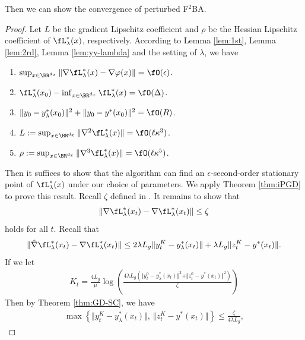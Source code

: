 Then we can show the convergence of perturbed F${}^2$BA.
\thmPFBA*
\begin{proof}
Let $L$ be the gradient Lipschitz coefficient and $\rho$ be the Hessian Lipschitz coefficient of $\fL_{\lambda}^*(x)$, respectively.
According to Lemma \ref{lem:1st}, Lemma \ref{lem:2rd}, Lemma \ref{lem:yy-lambda}  and the setting of $\lambda$, we have
\begin{enumerate}[label=\alph*.]
    \item $\sup_{x \in \BR^{d_x}} \Vert \nabla \fL_{\lambda}^*(x) - \nabla \varphi(x) \Vert = \fO(\epsilon)$. 
    \item $\fL_{\lambda}^*(x_0) - \inf_{x \in \BR^{d_x}}  \fL_{\lambda}^*(x) = \fO(\Delta)$.
    \item $\Vert y_0 - y_{\lambda}^*(x_0) \Vert^2 + \Vert y_0 - y^*(x_0) \Vert^2 =\fO(R)$.
    \item $ L:=\sup_{x \in \BR^{d_x}}\Vert \nabla^2 \fL_{\lambda}^*(x) \Vert = \fO(\ell \kappa^3)$.
    \item $\rho: = \sup_{x \in \BR^{d_x}} \Vert \nabla^3 \fL_{\lambda}^*(x) \Vert = \fO(\ell \kappa^5) $.
\end{enumerate}
Then it suffices to show that the algorithm can find an $\epsilon$-second-order stationary point of $\fL_{\lambda}^*(x)$ under our choice of parameters.
We apply Theorem \ref{thm:iPGD} to prove this result. 
Recall $\zeta$ defined in .
It remains to show that 
\begin{align} \label{eq:cond}
    \Vert \nabla \fL_{\lambda}^*(x_t) - \nabla \fL_{\lambda}^*(x_t) \Vert \le \zeta
\end{align}
holds for all $t$. Recall that
\begin{align*}
    \Vert \hat \nabla \fL_{\lambda}^*(x_t) - \nabla \fL_{\lambda}^*(x_t) \Vert \le 2 \lambda L_g \Vert y_{t}^K- y_{\lambda}^*(x_t) \Vert + \lambda L_g \Vert z_{t}^K - y^*(x_t) \Vert.
\end{align*} 
 If we let
\begin{align} \label{eq:Kt}
    K_t = \frac{4 L_g}{\mu} \log \left( 
    \frac{4 \lambda L_g ( \Vert y_t^0 - y_{\lambda}^*(x_t) \Vert^2 + \Vert z_t^0 - y^*(x_t) \Vert^2 )}{\zeta} 
    \right) 
\end{align}
Then by Theorem \ref{thm:GD-SC}, we have
\begin{align} \label{eq:induction}
     \max \left\{ \Vert y_t^K - y_{\lambda}^*(x_t) \Vert , ~\Vert z_t^K-  y^*(x_t) \Vert   \right\} \le \frac{\zeta}{4 \lambda L_g},

\end{align}
\end{proof}
